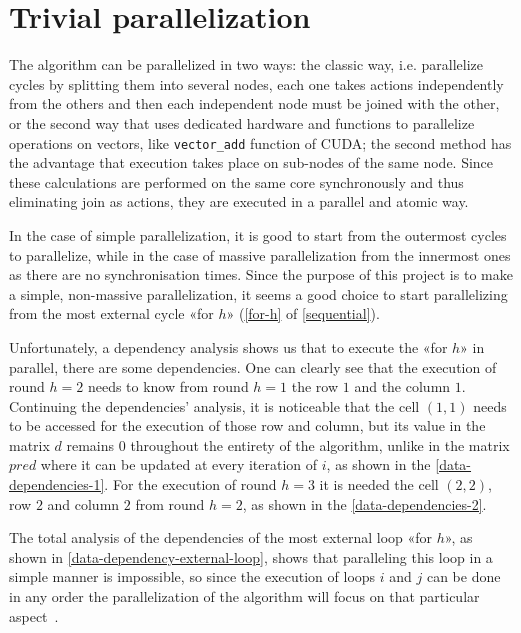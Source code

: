 \section{Trivial parallelization}\label{trivial_parallelization}

The algorithm can be parallelized in two ways: the classic way, i.e. parallelize cycles by splitting them into several nodes, each one takes actions independently from the others and then each independent node must be joined with the other, or the second way that uses dedicated hardware and functions to parallelize operations on vectors, like \texttt{vector_add} function of CUDA; the second method has the advantage that execution takes place on sub-nodes of the same node. Since these calculations are performed on the same core
synchronously and thus eliminating join as actions, they are executed in a parallel and atomic way.

In the case of simple parallelization, it is good to start from the outermost cycles to parallelize, while in the case of massive parallelization from the innermost ones as there are no synchronisation times.
Since the purpose of this project is to make a simple, non-massive parallelization, it seems a good choice to start parallelizing from the most external cycle «for \(h\)» (\cref{for-h} of \cref{sequential}).

Unfortunately, a dependency analysis shows us that to execute the «for \(h\)»  in parallel, there are some dependencies. One can clearly see that the execution of round \(h=2\) needs to know from round \(h=1\) the row \(1\) and the column \(1\). Continuing the dependencies' analysis, it is noticeable that the cell \((1,1)\) needs to be accessed for the execution of those row and column, but its value in the matrix \(d\) remains \(0\) throughout the entirety of the algorithm, unlike in the matrix \(pred\) where it can be updated at every iteration of \( i\), as shown in the \cref{data-dependencies-1}.
For the execution of round \(h=3\) it is needed the cell \((2,2)\), row \(2\) and column \(2\) from round \(h=2\), as shown in the \cref{data-dependencies-2}.

The total analysis of the dependencies of the most external loop «for \(h\)», as shown in \cref{data-dependency-external-loop}, shows that paralleling this loop in a simple manner is impossible, so since the execution of loops \(i\) and \(j\) can be done in any order the parallelization of the algorithm will focus on that particular aspect~\cite{rucci}.

